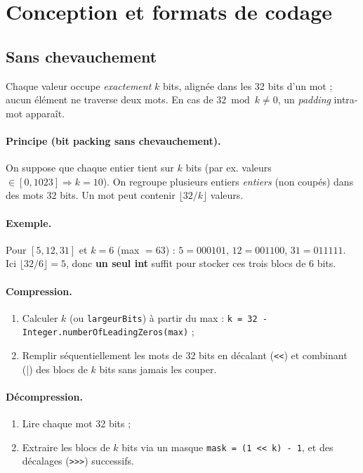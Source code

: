 \section{Conception et formats de codage}
\label{sec:conception}

\subsection{Sans chevauchement}
Chaque valeur occupe \emph{exactement} $k$ bits, alignée dans les 32 bits d'un mot ; aucun élément ne traverse deux mots. En cas de $32 \bmod k \neq 0$, un \emph{padding} intra-mot apparaît.

\paragraph{Principe (bit packing sans chevauchement).}
On suppose que chaque entier tient sur $k$ bits (par ex. valeurs $\in[0,1023] \Rightarrow k=10$). On regroupe plusieurs entiers \emph{entiers} (non coupés) dans des mots 32 bits. Un mot peut contenir $\lfloor 32/k\rfloor$ valeurs.

\paragraph{Exemple.}
Pour $[5,12,31]$ et $k=6$ (max $=63$) : $5=000101$, $12=001100$, $31=011111$. Ici $\lfloor 32/6\rfloor=5$, donc \textbf{un seul int} suffit pour stocker ces trois blocs de 6 bits.

\paragraph{Compression.}
\begin{enumerate}
  \item Calculer $k$ (ou \texttt{largeurBits}) à partir du max : \verb|k = 32 - Integer.numberOfLeadingZeros(max)| ;
  \item Remplir séquentiellement les mots de 32 bits en décalant (\verb|<<|) et combinant (\verb|||) des blocs de $k$ bits sans jamais les couper.
\end{enumerate}

\paragraph{Décompression.}
\begin{enumerate}
  \item Lire chaque mot 32 bits ;
  \item Extraire les blocs de $k$ bits via un masque \verb|mask = (1 << k) - 1|, et des décalages (\verb|>>>|) successifs.
\end{enumerate}

